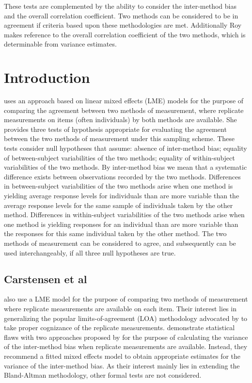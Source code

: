 \documentclass[12pt, a4paper]{report}
\theoremstyle{plain}
\theoremstyle{definition}
\theoremstyle{remark}
\begin{document}
These tests are complemented by the ability to consider the inter-method bias and the overall correlation coefficient.
Two methods can be considered to be in agreement if criteria based upon these methodologies are met. Additionally Roy makes reference to the overall correlation coefficient of the two methods, which is determinable from variance estimates.


		\section{Introduction}

	\citet{ARoy2009} uses an approach based on linear mixed effects (LME) models for the purpose of comparing the agreement between two methods of measurement, where replicate measurements on items (often individuals) by both methods are available. She provides three tests of hypothesis appropriate for evaluating the agreement between the two methods of measurement under this sampling scheme. These tests consider null hypotheses that assume: absence of inter-method bias; equality of between-subject variabilities of the two methods; equality of within-subject variabilities of the two methods. By inter-method bias we mean that a systematic difference exists between observations recorded by the two methods. Differences in between-subject variabilities of the two methods arise when one method is yielding average response levels for individuals than are more variable than the average response levels for the same sample of individuals taken by the other method.  Differences in within-subject variabilities of the two methods arise when one method is yielding responses for an individual than are more variable than the responses for this same individual taken by the other method. The two methods of measurement can be considered to agree, and subsequently can be used interchangeably, if all three null hypotheses are true.


\bigskip


	\subsection{Carstensen et al}
	\cite{BXC2008} also use a LME model for the purpose of comparing two methods of measurement where replicate measurements are available on each item. Their interest lies in generalizing the popular limits-of-agreement (LOA) methodology advocated by \citet{BA86} to take proper cognizance of the replicate measurements. \citet{BXC2008} demonstrate statistical flaws with two approaches proposed by \citet{BA99} for the purpose of calculating the variance of the inter-method bias when replicate measurements are available. Instead, they recommend a fitted mixed effects model to obtain appropriate estimates for the variance of the inter-method bias. As their interest mainly lies in extending the Bland-Altman methodology, other formal tests are not considered.
	
\end{document}
